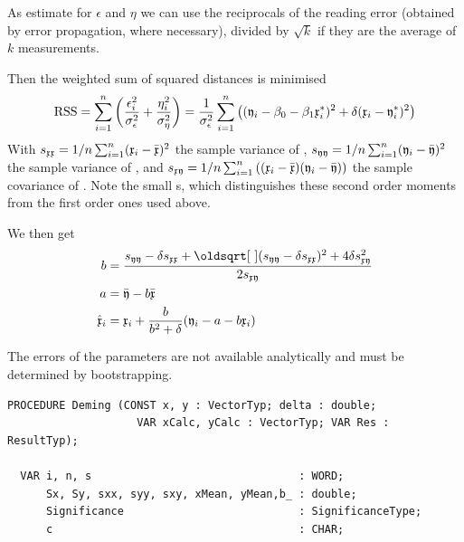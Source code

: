 \begin{refsection}
As estimate for \( \epsilon \) and \( \eta \) we can use the reciprocals of the reading error (obtained by error propagation, where necessary), divided by \(\sqrt{k} \) if they are the average of \( k \) measurements.

Then the weighted sum of squared distances is minimised
\begin{equation}
  \mathrm{RSS} = \sum_{i=1}^n\left(\frac{\epsilon_i^2}{\sigma^2_\epsilon} + \frac{\eta_i^2}{\sigma^2_\eta}\right)
               = \frac{1}{\sigma^2_\epsilon} \sum_{i=1}^n\left((\mathfrak{y}_i - \beta_0 - \beta_1 \mathfrak{x}_i^*)^2 + \delta (\mathfrak{x}_i - \mathfrak{y}_i^*)^2\right)
\end{equation}
With \(s_{\mathfrak{xx}} = 1/n \sum_{i=1}^n(\mathfrak{x}_i - \bar{\mathfrak{x}})^2 \) the sample variance of , \(s_{\mathfrak{yy}} = 1/n \sum_{i=1}^n(\mathfrak{y}_i - \bar{\mathfrak{y}})^2 \) the sample variance of , and \(s_{\mathfrak{xy}} = 1/n \sum_{i=1}^n\left((\mathfrak{x}_i - \bar{\mathfrak{x}})(\mathfrak{y}_i - \bar{\mathfrak{y}})\right) \)  the sample covariance of . Note the small s, which distinguishes these second order moments from the first order ones used above.

We then get
\begin{align}
  b              &= \frac{s_\AbsVec{yy} - \delta s_\AbsVec{xx} + \sqrt{(s_\AbsVec{yy} - \delta s_\AbsVec{xx})^2 + 4 \delta s^2_\AbsVec{xy}}}{2 s_\AbsVec{xy}} \\
  a              &= \bar{\AbsVec{y}} - b \bar{\AbsVec{x}}  \\
  \hat{\AbsVec{x}}_i &= \AbsVec{x}_i + \frac{b}{b^2 + \delta}(\AbsVec{y}_i - a - b\AbsVec{x}_i)\\
\end{align}

The errors of the parameters are not available analytically and must be determined by bootstrapping.

\begin{lstlisting}[caption=Deming-regression]
  PROCEDURE Deming (CONST x, y : VectorTyp; delta : double;
                    VAR xCalc, yCalc : VectorTyp; VAR Res : ResultTyp);

  VAR i, n, s                                : WORD;
      Sx, Sy, sxx, syy, sxy, xMean, yMean,b_ : double;
      Significance                           : SignificanceType;
      c                                      : CHAR;


\end{lstlisting}
\end{refsection}
